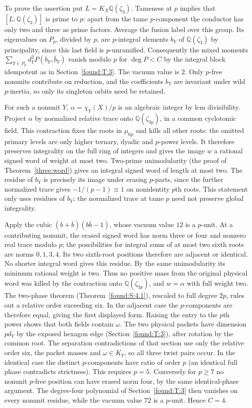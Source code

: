 \documentclass[11pt,a4paper]{article}
\numberwithin{equation}{section}
\theoremstyle{remark}
\newcommand{\QQ}{\mathbb Q}
\begin{document}
To prove the assertion put $L=K_X\QQ(\zeta_3)$. Tameness at $p$ implies that $[L:\QQ(\zeta_3)]$ is prime to $p$: apart from the tame $p$-component the conductor has only two and three as prime factors. Average the fusion label over this group. Its eigenvalues on $P_p$, divided by $p$, are $p$-integral elements $b_Y$ of $\QQ(\zeta_3)$ by principality, since this last field is $p$-unramified. Consequently the mixed moments $\sum_{Y\in P_p}d_Y^2P(b_Y,\bar b_Y)$ vanish modulo $p$ for $\deg P<C$ by the integral block idempotent as in Section~\ref{found:T:3}. The vacuum value is $2$. Only $p$-free nonunits contribute on reduction, and the coefficients $b_Y$ are invariant under wild $p$-inertia, so only its singleton orbits need be retained.

For such a nonunit $Y$, $\alpha=\chi_Y(X)/p$ is an algebraic integer by lcm divisibility. Project $\alpha$ by normalized relative trace onto $\QQ(\zeta_{3p})$, in a common cyclotomic field. This contraction fixes the roots in $\mu_{6p}$ and kills all other roots: the omitted primary levels are only higher ternary, dyadic and $p$-power levels. It therefore preserves integrality on the full ring of integers and gives the image $w$ a rational signed word of weight at most two. Two-prime unimodularity (the proof of Theorem~\ref{three:word}) gives an integral signed word of length at most two. The residue of $b_Y$ is precisely its image under erasing $p$-parts, since the further normalized trace gives $-1/(p-1)\equiv1$ on nonidentity $p$th roots. This statement only uses residues of $b_Y$; the normalized trace at tame $p$ need not preserve global integrality.

Apply the cubic $(b+\bar b)(b\bar b-1)$, whose vacuum value $12$ is a $p$-unit. At a contributing nonunit, the erased signed word has norm three or four and nonzero real trace modulo $p$; the possibilities for integral sums of at most two sixth roots are norms $0,1,3,4$. Its two sixth-root positions therefore are adjacent or identical. No shorter integral word gives this residue. By the same unimodularity its minimum rational weight is two. Thus no positive mass from the original physical word was killed by the contraction onto $\QQ(\zeta_{3p})$, and $w=\alpha$ with full weight two. The two-phase theorem (Theorem~\ref{found:S:4.1}), rescaled to full degree $2p$, rules out a relative order exceeding six. In the adjacent case the $p$-components are therefore equal, giving the first displayed form. Raising the entry to the $p$th power shows that both fields contain $\omega$. The two physical packets have dimension $p d_Y$ by the exposed hexagon edge (Section~\ref{found:T:3}), after rotation by the common root. The separation contradictions of that section use only the relative order six, the packet masses and $\omega\in K_Y$, so all three twist pairs occur. In the identical case the distinct $p$-components have ratio of order $p$ (an identical full phase contradicts strictness). This requires $p=5$. Conversely for $p\ge7$ no nonunit $p$-free position can have erased norm four, by the same identical-phase argument. The degree-four polynomial of Section~\ref{found:T:3} then vanishes on every nonunit residue, while the vacuum value $72$ is a $p$-unit. Hence $C=4$.
\end{document}
